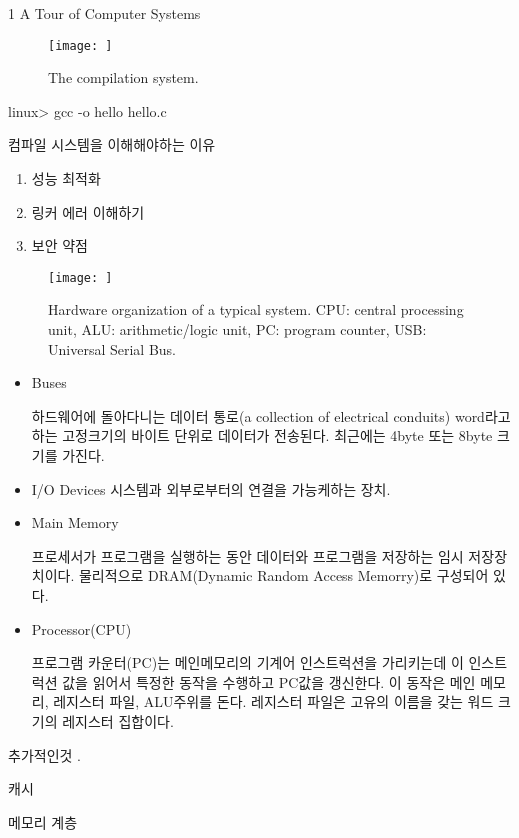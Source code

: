 
1 A Tour of Computer Systems 


\begin{figure}[h!]
    \centering
    \texttt{[image: ]}
    \caption{The compilation system.}
\end{figure}

linux> gcc -o hello hello.c

컴파일 시스템을 이해해야하는 이유

\begin{enumerate}
    \item 성능 최적화
    \item 링커 에러 이해하기
    \item 보안 약점
\end{enumerate}


\begin{figure}[h!]
    \centering
    \texttt{[image: ]}
    \caption{Hardware organization
    of a typical system. CPU:
    central processing unit,
    ALU: arithmetic/logic unit,
    PC: program counter, USB:
    Universal Serial Bus.}
\end{figure}


\begin{itemize}
    \item Buses
    
    하드웨어에 돌아다니는 데이터 통로(a collection of electrical conduits) word라고 하는 고정크기의 바이트 단위로 데이터가 전송된다. 최근에는 4byte 또는 8byte 크기를 가진다.

    \item I/O Devices
    시스템과 외부로부터의 연결을 가능케하는 장치.

    \item Main Memory
    
    프로세서가 프로그램을 실행하는 동안 데이터와 프로그램을 저장하는 임시 저장장치이다. 물리적으로 DRAM(Dynamic Random Access Memorry)로 구성되어 있다.

    \item Processor(CPU)
    
    프로그램 카운터(PC)는 메인메모리의 기계어 인스트럭션을 가리키는데 이 인스트럭션 값을 읽어서 특정한 동작을 수행하고 PC값을 갱신한다. 이 동작은 메인 메모리, 레지스터 파일, ALU주위를 돈다.
    레지스터 파일은 고유의 이름을 갖는 워드 크기의 레지스터 집합이다.
\end{itemize}

추가적인것 .

캐시

메모리 계층

